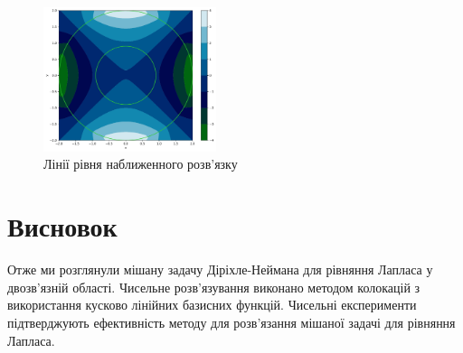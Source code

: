 \documentclass[14pt,a4paper]{extarticle}
\newcounter{e}
\numberwithin{equation}{section}
\numberwithin{figure}{section}
\begin{document}
\begin{figure}[!htb]
	\centering
	\includegraphics[width=0.45\textwidth]{resources/ex2_contourf.pdf}
	\caption{Лінії рівня наближенного розв'язку}
	\label{fig:ex2_contourf}
\end{figure}

  
  \newpage
  \section{Висновок}
	Отже ми розглянули мішану задачу Діріхле-Неймана для рівняння Лапласа у двозв’язній області. Чисельне розв’язування виконано методом колокацій з використання кусково лінійних базисних функцій. Чисельні експерименти підтверджують ефективність методу для розв’язання мішаної задачі для рівняння Лапласа.
	
  
  
 \newpage 

\nocite{kress2012linear}
\nocite{atkinson2009}
\nocite{chapko2009altrating}
\nocite{chapko2009numerical}


\printbibliography[title={Бібліографія}]
\end{document}
